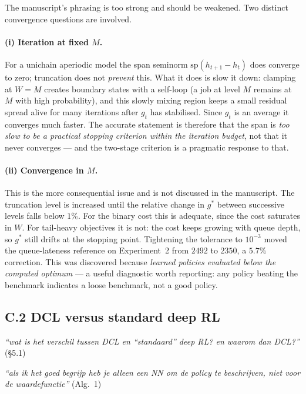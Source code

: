 \documentclass[11pt,a4paper]{article}
\newcommand{\comment}[1]{\textcolor{red!70!black}{\textit{``#1''}}}
\begin{document}
The manuscript's phrasing is too strong and should be weakened.  Two distinct
convergence questions are involved.

\paragraph{(i) Iteration at fixed $M$.}
For a unichain aperiodic model the span seminorm
$\mathrm{sp}(h_{t+1} - h_t)$ does converge to zero; truncation does not
\emph{prevent} this.  What it does is slow it down: clamping at $W = M$ creates
boundary states with a self-loop (a job at level $M$ remains at $M$ with high
probability), and this slowly mixing region keeps a small residual spread alive
for many iterations after $g_t$ has stabilised.  Since $g_t$ is an average it
converges much faster.  The accurate statement is therefore that the span is
\emph{too slow to be a practical stopping criterion within the iteration
budget}, not that it never converges --- and the two-stage criterion is a
pragmatic response to that.

\paragraph{(ii) Convergence in $M$.}
This is the more consequential issue and is not discussed in the manuscript.
The truncation level is increased until the relative change in $g^*$ between
successive levels falls below $1\%$.  For the binary cost this is adequate, since
the cost saturates in $W$.  For tail-heavy objectives it is not: the cost keeps
growing with queue depth, so $g^*$ still drifts at the stopping point.
Tightening the tolerance to $10^{-3}$ moved the queue-lateness reference on
Experiment~2 from $2492$ to $2350$, a $5.7\%$ correction.  This was discovered
because \emph{learned policies evaluated below the computed optimum} --- a useful
diagnostic worth reporting: any policy beating the benchmark indicates a loose
benchmark, not a good policy.

\subsection*{C.2 DCL versus standard deep RL}

\comment{wat is het verschil tussen DCL en ``standaard'' deep RL? en waarom dan
DCL?} \hfill (\S5.1)

\comment{als ik het goed begrijp heb je alleen een NN om de policy te
beschrijven, niet voor de waardefunctie} \hfill (Alg.~1)
\end{document}
